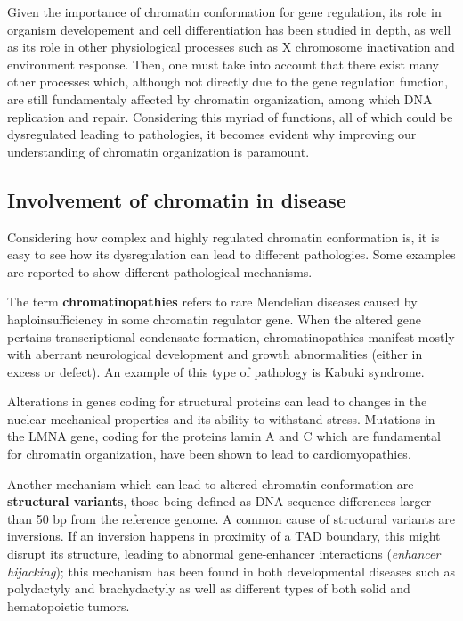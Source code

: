 Given the importance of chromatin conformation for gene regulation, its role in organism developement and cell differentiation has been studied in depth\cite{chromatindevelopment2019}, as well as its role in other physiological processes such as X chromosome inactivation\cite{xsilencing2017} and environment response\cite{epigeneticsenvironment2019}. Then, one must take into account that there exist many other processes which, although not directly due to the gene regulation function, are still fundamentaly affected by chromatin organization, among which DNA replication\cite{chromatinreplication2017} and repair\cite{chromatinrepair2017}. Considering this myriad of functions, all of which could be dysregulated leading to pathologies, it becomes evident why improving our understanding of chromatin organization is paramount.

\subsection{Involvement of chromatin in disease}
Considering how complex and highly regulated chromatin conformation is, it is easy to see how its dysregulation can lead to different pathologies. Some examples are reported to show different pathological mechanisms.

The term \textbf{chromatinopathies} refers to rare Mendelian diseases caused by haploinsufficiency in some chromatin regulator gene. When the altered gene pertains transcriptional condensate formation, chromatinopathies manifest mostly with aberrant neurological development and growth abnormalities (either in excess or defect). An example of this type of pathology is Kabuki syndrome\cite{condensates2023}.

Alterations in genes coding for structural proteins can lead to changes in the nuclear mechanical properties and its ability to withstand stress. Mutations in the LMNA gene, coding for the proteins lamin A and C which are fundamental for chromatin organization, have been shown to lead to cardiomyopathies\cite{chromatincardiomyopathy2021}. 

Another mechanism which can lead to altered chromatin conformation are \textbf{structural variants}, those being defined as DNA sequence differences larger than 50 bp from the reference genome\cite{sequencevariations2023}. A common cause of structural variants are inversions. If an inversion happens in proximity of a TAD boundary, this might disrupt its structure, leading to abnormal gene-enhancer interactions (\emph{enhancer hijacking}); this mechanism has been found in both developmental diseases such as polydactyly and brachydactyly\cite{epigeneticlimb2015} as well as different types of both solid and hematopoietic tumors\cite{chromatincancer2022, sequencevariations2023}.

